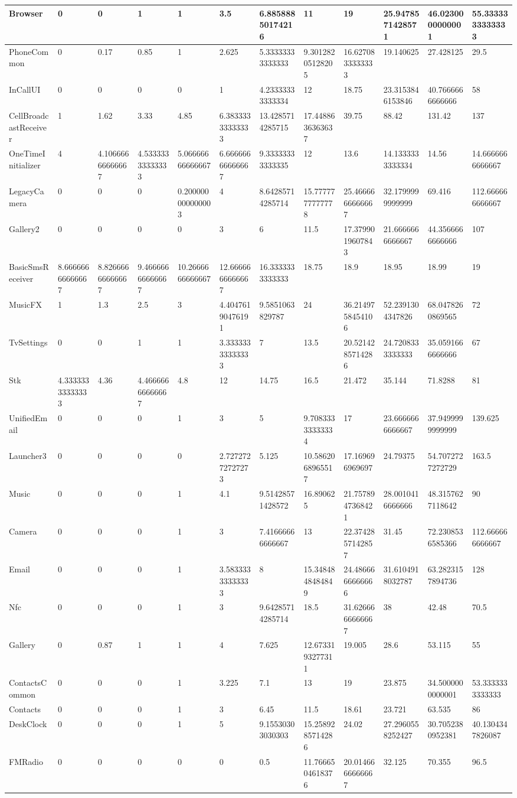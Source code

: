 \documentclass[a4paper]{article}
\begin{document}
\begin{tabular}{|l|l|l|l|l|l|l|l|l|l|l|l|}
Browser&0&0&1&1&3.5&6.88588850174216&11&19&25.9478571428571&46.0230000000001&55.3333333333333\\
\hline
PhoneCommon&0&0.17&0.85&1&2.625&5.33333333333333&9.30128205128205&16.6270833333333&19.140625&27.428125&29.5\\
\hline
InCallUI&0&0&0&0&1&4.23333333333334&12&18.75&23.3153846153846&40.7666666666666&58\\
\hline
CellBroadcastReceiver&1&1.62&3.33&4.85&6.38333333333333&13.4285714285715&17.4488636363637&39.75&88.42&131.42&137\\
\hline
OneTimeInitializer&4&4.10666666666667&4.53333333333333&5.06666666666667&6.66666666666667&9.33333333333335&12&13.6&14.1333333333334&14.56&14.6666666666667\\
\hline
LegacyCamera&0&0&0&0.200000000000003&4&8.64285714285714&15.7777777777778&25.4666666666667&32.1799999999999&69.416&112.666666666667\\
\hline
Gallery2&0&0&0&0&3&6&11.5&17.3799019607843&21.6666666666667&44.3566666666666&107\\
\hline
BasicSmsReceiver&8.66666666666667&8.82666666666667&9.46666666666667&10.2666666666667&12.6666666666667&16.3333333333333&18.75&18.9&18.95&18.99&19\\
\hline
MusicFX&1&1.3&2.5&3&4.40476190476191&9.5851063829787&24&36.2149758454106&52.2391304347826&68.0478260869565&72\\
\hline
TvSettings&0&0&1&1&3.33333333333333&7&13.5&20.5214285714286&24.7208333333333&35.0591666666666&67\\
\hline
Stk&4.33333333333333&4.36&4.46666666666667&4.8&12&14.75&16.5&21.472&35.144&71.8288&81\\
\hline
UnifiedEmail&0&0&0&1&3&5&9.70833333333334&17&23.6666666666667&37.9499999999999&139.625\\
\hline
Launcher3&0&0&0&0&2.72727272727273&5.125&10.5862068965517&17.169696969697&24.79375&54.7072727272729&163.5\\
\hline
Music&0&0&0&1&4.1&9.51428571428572&16.890625&21.7578947368421&28.0010416666666&48.3157627118642&90\\
\hline
Camera&0&0&0&1&3&7.41666666666667&13&22.3742857142857&31.45&72.2308536585366&112.666666666667\\
\hline
Email&0&0&0&1&3.58333333333333&8&15.3484848484849&24.4866666666666&31.6104918032787&63.2823157894736&128\\
\hline
Nfc&0&0&0&1&3&9.64285714285714&18.5&31.6266666666667&38&42.48&70.5\\
\hline
Gallery&0&0.87&1&1&4&7.625&12.6733193277311&19.005&28.6&53.115&55\\
\hline
ContactsCommon&0&0&0&1&3.225&7.1&13&19&23.875&34.5000000000001&53.3333333333333\\
\hline
Contacts&0&0&0&1&3&6.45&11.5&18.61&23.721&63.535&86\\
\hline
DeskClock&0&0&0&1&5&9.15530303030303&15.2589285714286&24.02&27.2960558252427&30.7052380952381&40.1304347826087\\
\hline
FMRadio&0&0&0&0&0&0.5&11.7666504618376&20.0146666666667&32.125&70.355&96.5\\
\hline
\end{tabular}
\end{document}
